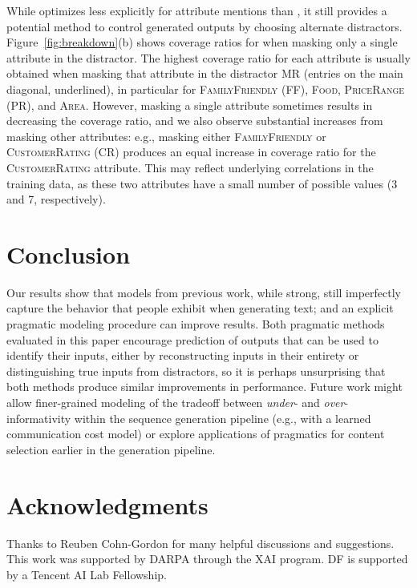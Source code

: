 \documentclass[11pt,a4paper]{article}
\newcommand{\basespk}[0]{\xspace}
\newcommand{\pragd}[0]{\xspace}
\newcommand{\pragr}[0]{\xspace}
\newcommand{\eg}{e.g., }
\begin{document}
While \pragd optimizes less explicitly for attribute mentions than \pragr, it still provides a potential method to control generated outputs by choosing alternate distractors. Figure~\ref{fig:breakdown}(b) shows coverage ratios for \pragd when masking only a single attribute in the distractor.
The highest coverage ratio for each attribute is usually obtained when masking that attribute in the distractor MR (entries on the main diagonal, underlined), in particular for  \textsc{FamilyFriendly} (\textsc{FF}), \textsc{Food}, \textsc{PriceRange} (\textsc{PR}), and \textsc{Area}. However, masking a single attribute sometimes results in decreasing the coverage ratio, and we also observe substantial increases from masking other attributes: \eg masking either \textsc{FamilyFriendly} or \textsc{CustomerRating} (\textsc{CR}) produces an equal increase in coverage ratio for the \textsc{CustomerRating} attribute. This may reflect underlying correlations in the training data, as these two attributes have a small number of possible values (3 and 7, respectively). 


 \section{Conclusion}

Our results show that
\basespk models from previous work, while strong,
still imperfectly capture the behavior that people exhibit when generating text; 
and an explicit pragmatic modeling procedure can improve results.
Both pragmatic methods evaluated in this paper encourage prediction of outputs that can be used to identify their inputs, either by reconstructing inputs in their entirety or distinguishing true inputs from distractors, so it is perhaps unsurprising that both methods produce similar improvements in performance. 
Future work might allow finer-grained modeling of the tradeoff between \emph{under}- and \emph{over}-informativity within the sequence generation pipeline (\eg with a learned communication cost model) or explore applications of pragmatics for content selection earlier in the generation pipeline.





 


\section*{Acknowledgments}
Thanks to Reuben Cohn-Gordon for many helpful discussions and suggestions. This work was supported
by DARPA through the XAI program. DF is supported by a Tencent AI Lab Fellowship.
\end{document}
